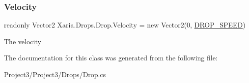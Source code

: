 \subsubsection{\texorpdfstring{Velocity}{Velocity}}
{\footnotesize\ttfamily readonly Vector2 Xaria.\+Drops.\+Drop.\+Velocity = new Vector2(0, \hyperlink{classXaria_1_1Drops_1_1Drop_a9b124fd6ebca83cbfaeb6a591e8717db}{D\+R\+O\+P\+\_\+\+S\+P\+E\+ED})}



The velocity 



The documentation for this class was generated from the following file\+:\begin{DoxyCompactItemize}
\item 
Project3/\+Project3/\+Drops/Drop.\+cs\end{DoxyCompactItemize}
